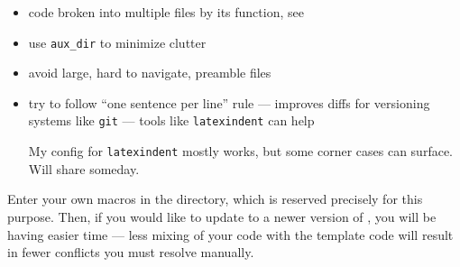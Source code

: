 \begin{itemize}
    \item code broken into multiple files by its function, see 
    \item use \verb|aux_dir| to minimize clutter
    \item avoid large, hard to navigate, preamble files
    \item try to follow \enquote{one sentence per line} rule --- improves diffs for versioning systems like \texttt{git} --- tools like \texttt{latexindent} can help
          \begin{Note}
              My config for \texttt{latexindent} mostly works, but some corner cases can surface.
              Will share someday.
          \end{Note}
\end{itemize}

\begin{remark}
    Enter your own macros in the  directory, which is reserved precisely for this purpose.
    Then, if you would like to update to a newer version of \TeXtured{}, you will be having easier time --- less mixing of your code with the template code will result in fewer conflicts you must resolve manually.
\end{remark}

